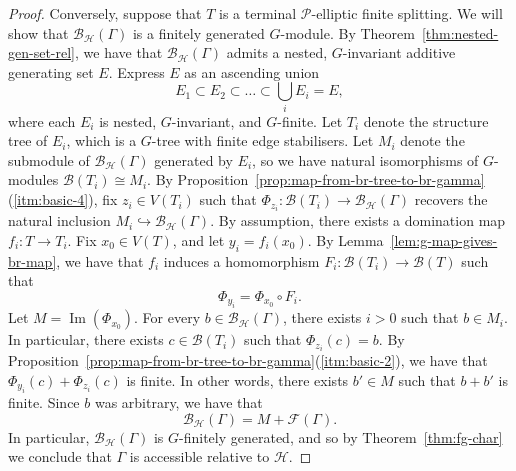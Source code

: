 \documentclass[11pt,a4paper]{amsart}
\newcommand{\into}{\hookrightarrow}
\newtheorem{lemma}[theorem]{Lemma}
\theoremstyle{definition}
\newcommand{\per}{\mathcal{H}}
\newcommand{\br}{{\mathscr{B}}}
\begin{document}
\begin{proof}
    Conversely, suppose that $T$ is a terminal $\mathcal P$-elliptic finite splitting. We will show that $\br_\per(\Gamma)$ is a finitely generated $G$-module. 
    By Theorem~\ref{thm:nested-gen-set-rel}, we have that $\br_\per(\Gamma)$ admits a nested, $G$-invariant additive generating set $E$. 
    Express $E$ as an ascending union
    $$
    E_1 \subset E_2 \subset \ldots \subset \bigcup_iE_i = E,
    $$
    where each $E_i$ is nested, $G$-invariant, and $G$-finite. Let $T_i$ denote the structure tree of $E_i$, which is a $G$-tree with finite edge stabilisers. 
    Let $M_i$ denote the submodule of $\br_\per(\Gamma)$ generated by $E_i$, so we have  natural isomorphisms of $G$-modules $\br(T_i) \cong M_i$.
    By Proposition~\ref{prop:map-from-br-tree-to-br-gamma}(\ref{itm:basic-4}), fix $z_i \in V(T_i)$ such that $\Phi_{z_i} : \br(T_i) \to \br_\per(\Gamma)$ recovers the natural inclusion $M_i \into \br_\per(\Gamma)$. 
    By assumption, there exists a domination map $f_i : T \to T_i$. Fix $x_0 \in V(T)$, and let $y_i = f_i(x_0)$. By Lemma~\ref{lem:g-map-gives-br-map}, we have that $f_i$ induces a homomorphism $F_i : \br(T_i) \to \br(T)$ such that
    $$
    \Phi_{y_i} = \Phi_{x_0} \circ F_i.
    $$
    Let $M = \operatorname{Im}(\Phi_{x_0})$.
    For every $b \in \br_\per(\Gamma)$, there exists $i > 0$ such that $b \in M_i$. In particular, there exists $c \in \br(T_i)$ such that $\Phi_{z_i}(c) = b$. By Proposition~\ref{prop:map-from-br-tree-to-br-gamma}(\ref{itm:basic-2}), we have that 
    $
    \Phi_{y_i}(c) + \Phi_{z_i}(c)
    $
    is finite. In other words, there exists $b' \in M$ such that $b + b'$ is finite. 
    Since $b$ was arbitrary, we have that 
    $$
    \br_\per(\Gamma) = M + \mathscr F(\Gamma).
    $$
    In particular, $\br_\per(\Gamma)$ is $G$-finitely generated, and so by Theorem~\ref{thm:fg-char} we conclude that $\Gamma$ is accessible relative to $\per$. 
\end{proof}





\end{document}
